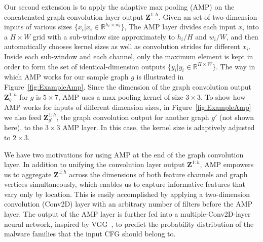 Our second extension is to apply the adaptive max pooling (AMP) on the concatenated graph convolution layer output $\mathbf{Z}^{1:h}$.
Given an set of two-dimension inputs of various sizes $\{x_i | x_i \in \mathbb{R}^{h_i \times w_i}\}$,
The AMP layer divides each input $x_i$ into a $H \times W$ grid with a sub-window size approximately to $h_i / H$ and $w_i / W$,
and then automatically chooses kernel sizes as well as convolution strides for different $x_i$.
Inside each sub-window and each channel, only the maximum element is kept in order to form the set of identical-dimension outputs $\{y_i | y_i \in \mathbb{R}^{ H \times W}\}$.
The way in which AMP works for our sample graph $g$ is illustrated in Figure~\ref{fig:ExampleAmp}.
Since the dimension of the graph convolution output $\mathbf{Z}^{1:h}_g$ for $g$ is $5 \times 7$, AMP uses a max pooling kernel of size $3 \times 3$.
To show how AMP works for inputs of different dimension sizes, in Figure~\ref{fig:ExampleAmp} we also feed $\mathbf{Z}^{1:h}_{g'}$, the graph convolution output for another graph $g'$ (not shown here), to the $3 \times 3$ AMP layer. In this case, the kernel size is adaptively adjusted to $2 \times 3$.

We have two motivations for using AMP at the end of the graph convolution layer.
In addition to unifying the convolution layer output $\mathbf{Z}^{1:h}$, AMP empowers us to aggregate $\mathbf{Z}^{1:h}$
across the dimensions of both feature channels and graph vertices simultaneously,
which enables us to capture informative features that vary only by location.
This is easily accomplished by applying a two-dimension convolution (Conv2D) layer with an arbitrary number of filters before the AMP layer.
The output of the AMP layer is further fed into a multiple-Conv2D-layer neural network, inspired by VGG~\cite{VGG}, to predict the probability distribution of the malware families that the input CFG should belong to.


